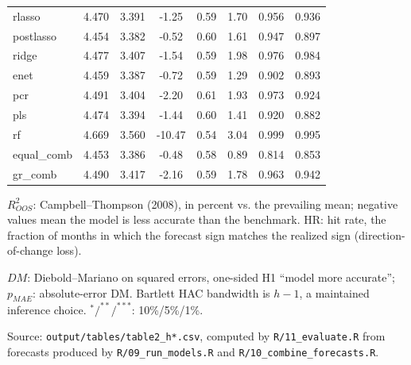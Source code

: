 \begin{table}[H]
\begin{threeparttable}
\begin{tabular}{lccccccc}
rlasso & 4.470 & 3.391 & -1.25 & 0.59 & 1.70 & 0.956 & 0.936 \\
postlasso & 4.454 & 3.382 & -0.52 & 0.60 & 1.61 & 0.947 & 0.897 \\
ridge & 4.477 & 3.407 & -1.54 & 0.59 & 1.98 & 0.976 & 0.984 \\
enet & 4.459 & 3.387 & -0.72 & 0.59 & 1.29 & 0.902 & 0.893 \\
pcr & 4.491 & 3.404 & -2.20 & 0.61 & 1.93 & 0.973 & 0.924 \\
pls & 4.474 & 3.394 & -1.44 & 0.60 & 1.41 & 0.920 & 0.882 \\
rf & 4.669 & 3.560 & -10.47 & 0.54 & 3.04 & 0.999 & 0.995 \\
equal\_comb & 4.453 & 3.386 & -0.48 & 0.58 & 0.89 & 0.814 & 0.853 \\
gr\_comb & 4.490 & 3.417 & -2.16 & 0.59 & 1.78 & 0.963 & 0.942 \\
\bottomrule
\end{tabular}
\begin{tablenotes}
\normalsize
\item $R^2_{OOS}$: Campbell--Thompson (2008), in percent vs. the prevailing mean; negative values mean the model is less accurate than the benchmark. HR: hit rate, the fraction of months in which the forecast sign matches the realized sign (direction-of-change loss).
\item $DM$: Diebold--Mariano on squared errors, one-sided H1 ``model more accurate''; $p_{MAE}$: absolute-error DM. Bartlett HAC bandwidth is $h-1$, a maintained inference choice. $^{*}/^{**}/^{***}$: 10\%/5\%/1\%.
\item Source: \texttt{output/tables/table2\_h*.csv}, computed by \texttt{R/11\_evaluate.R} from forecasts produced by \texttt{R/09\_run\_models.R} and \texttt{R/10\_combine\_forecasts.R}.
\end{tablenotes}
\end{threeparttable}
\end{table}
